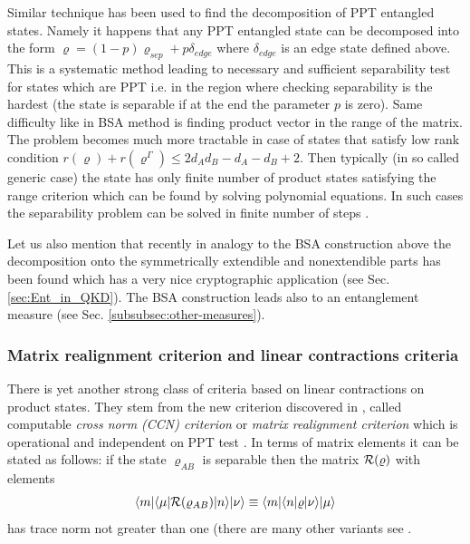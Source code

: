 \documentclass[twocolumn,aps,rmp]{revtex4}
\begin{document}
Similar technique has been used to find the decomposition of PPT
entangled states. Namely it happens that any PPT entangled state can
be decomposed into the form $\varrho=(1-p) \varrho_{sep} +
p\delta_{edge}$ where $\delta_{edge}$ is an edge state defined
above.
This is a systematic method leading to necessary and sufficient
separability test for states which are PPT i.e. in the
region where checking separability is the hardest (the state is
separable if at the end the parameter $p$ is zero). Same difficulty
like in BSA method is finding product vector in  the range of the
matrix. The problem becomes much more tractable in case of states
that satisfy low rank condition \cite{Ho00} $r(\varrho)+
r(\varrho^{\Gamma}) \leq 2d_{A}d_{B}-d_{A}-d_{B}+2$. Then
typically (in so called generic case) the state has only finite
number of product states satisfying the range criterion which can
be found by solving polynomial equations. In such cases the
separability problem can be solved in finite number of steps
\cite{Ho00}.

Let us also mention that recently in analogy to the BSA construction
above the decomposition onto the symmetrically extendible and
nonextendible parts has been found which has a very nice cryptographic
application \cite{MoroderCL2005-povmintr} (see
Sec. \ref{sec:Ent_in_QKD}). The BSA construction leads also to an
entanglement measure (see Sec. \ref{subsubsec:other-measures}).



\subsubsection{Matrix realignment criterion and linear contractions
criteria}
\label{subsubsec:realignment}

There is yet another strong class of criteria based on linear
contractions on product states. They stem from the new criterion
discovered in \cite{Rudolph2003-JPA}, \cite{ChenWu} called computable
{\it cross norm (CCN) criterion} or {\it matrix realignment criterion}
which is operational and independent on PPT test \cite{Peres96}. In
terms of matrix elements it can be stated as follows: if the state
$\varrho_{AB}$ is separable then the matrix ${\cal R}(\varrho)$ with
elements
\begin{equation}
\langle m| \langle \mu| {\cal R}(\varrho_{AB}) |n \rangle |\nu
\rangle \equiv \langle m| \langle n| \varrho |\nu \rangle |\mu
\rangle
\end{equation}
has trace norm not greater than one (there are many other variants see
\cite{HHH02-permut}.
\end{document}
